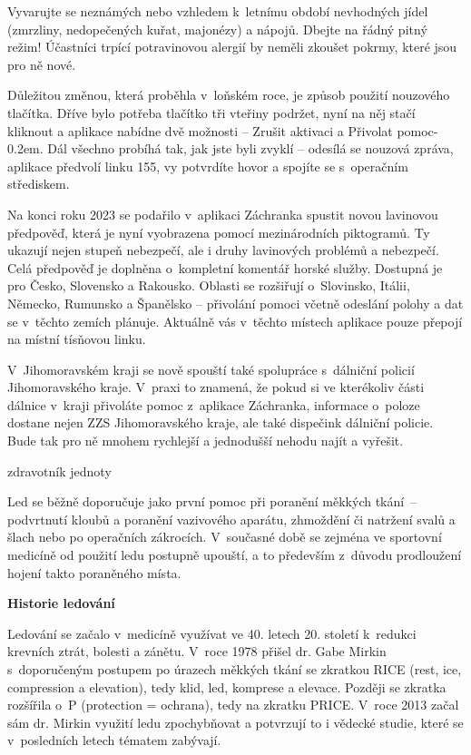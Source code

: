 \documentclass[11pt]{article}
\begin{document}
Vyvarujte se neznámých nebo vzhledem k~letnímu období nevhodných jídel (zmrzliny, nedopečených kuřat, majonézy) a nápojů. Dbejte na řádný pitný režim! Účastníci trpící potravinovou alergií by neměli zkoušet pokrmy, které jsou pro ně nové.

Důležitou změnou, která proběhla v~loňském roce, je způsob použití nouzového tlačítka. Dříve bylo potřeba tlačítko tři vteřiny podržet, nyní na něj stačí kliknout a aplikace nabídne dvě možnosti – \luv{}Zrušit aktivaci\ruv{} a \luv{}Přivolat pomoc\ruv{}\kern-0.2em. Dál všechno probíhá tak, jak jste byli zvyklí – odesílá se nouzová zpráva, aplikace předvolí linku 155, vy potvrdíte hovor a spojíte se s~operačním střediskem.

Na konci roku 2023 se podařilo v~aplikaci Záchranka spustit novou lavinovou předpověď, která je nyní vyobrazena pomocí mezinárodních piktogramů. Ty ukazují nejen stupeň nebezpečí, ale i druhy lavinových problémů a nebezpečí. Celá předpověď je doplněna o~kompletní komentář horské služby. Dostupná je pro Česko, Slovensko a Rakousko. Oblasti se rozšiřují o~Slovinsko, Itálii, Německo, Rumunsko a Španělsko – přivolání pomoci včetně odeslání polohy a dat se v~těchto zemích plánuje. Aktuálně vás v~těchto místech aplikace pouze přepojí na místní tísňovou linku.

V~Jihomoravském kraji se nově spouští také spolupráce s~dálniční policií Jihomoravského kraje. V~praxi to znamená, že pokud si ve kterékoliv části dálnice v~kraji přivoláte pomoc z~aplikace Záchranka, informace o~poloze dostane nejen ZZS Jihomoravského kraje, ale také dispečink dálniční policie. Bude tak pro ně mnohem rychlejší a jednodušší nehodu najít  a vyřešit.

\signature{Vít Jakoubek}{zdravotník jednoty}
\vspace*{24pt}

Led se běžně doporučuje jako první pomoc při poranění měkkých tkání~– podvrtnutí kloubů a poranění vazivového aparátu, zhmoždění či natržení svalů a šlach nebo po operačních zákrocích. V~současné době se zejména ve sportovní medicíně od použití ledu postupně upouští, a to především z~důvodu prodloužení hojení takto poraněného místa.

\begin{center}
  \textbf{Historie ledování}
\end{center}

Ledování se začalo v~medicíně využívat ve 40. letech 20. století k~redukci krevních ztrát, bolesti a zánětu. V~roce 1978 přišel dr. Gabe Mirkin s~doporučeným postupem po úrazech měkkých tkání se zkratkou RICE (rest, ice, compression a elevation), tedy klid, led, komprese a elevace. Později se zkratka rozšířila o~P (protection = ochrana), tedy na zkratku PRICE. V~roce 2013 začal sám dr. Mirkin využití ledu zpochybňovat a potvrzují to i vědecké studie, které se v~posledních letech tématem zabývají.
\end{document}
